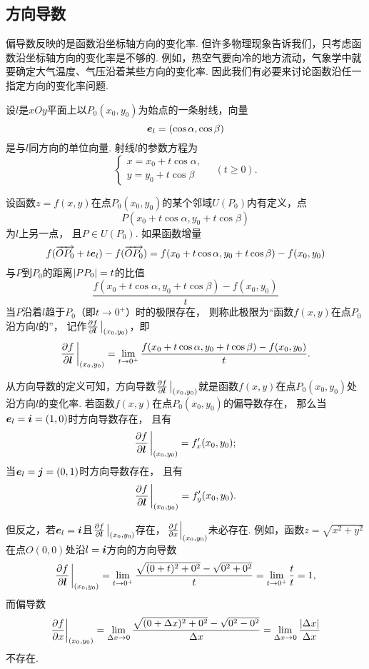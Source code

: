 \subsection{方向导数}
偏导数反映的是函数沿坐标轴方向的变化率.
但许多物理现象告诉我们，只考虑函数沿坐标轴方向的变化率是不够的.
例如，热空气要向冷的地方流动，气象学中就要确定大气温度、气压沿着某些方向的变化率.
因此我们有必要来讨论函数沿任一指定方向的变化率问题.

\begin{definition}
设\(l\)是\(xOy\)平面上以\(P_0(x_0,y_0)\)为始点的一条射线，向量\[
	\boldsymbol{e}_l=(\cos\alpha,\cos\beta)
\]是与\(l\)同方向的单位向量.
射线\(l\)的参数方程为\[
	\left\{ \begin{array}{l}
		x=x_0+t\cos\alpha, \\
		y=y_0+t\cos\beta
	\end{array} \right.
	\quad(t \geq 0).
\]

设函数\(z=f(x,y)\)在点\(P_0(x_0,y_0)\)的某个邻域\(U(P_0)\)内有定义，点\[
	P(x_0+t\cos\alpha,y_0+t\cos\beta)
\]为\(l\)上另一点，
且\(P \in U(P_0)\).
如果函数增量\[
	f(\overrightarrow{O P_0} + t \boldsymbol{e}_l) - f(\overrightarrow{O P_0})
	= f(x_0+t\cos\alpha,y_0+t\cos\beta)-f(x_0,y_0)
\]与\(P\)到\(P_0\)的距离\(\abs{PP_0}=t\)的比值\[
\frac{f(x_0+t\cos\alpha,y_0+t\cos\beta)-f(x_0,y_0)}{t}
\]当\(P\)沿着\(l\)趋于\(P_0\)（即\(t\to0^+\)）时的极限存在，
则称此极限为“函数\(f(x,y)\)在点\(P_0\)沿方向\(l\)的”，
记作\(\pdv{f}{\vb{l}}\eval_{(x_0,y_0)}\)，即\[
\pdv{f}{\vb{l}}\eval_{(x_0,y_0)}
=\lim_{t\to0^+} \frac{f(x_0+t\cos\alpha,y_0+t\cos\beta)-f(x_0,y_0)}{t}.
\]
\end{definition}

从方向导数的定义可知，方向导数\(\pdv{f}{\vb{l}}\eval_{(x_0,y_0)}\)就是函数\(f(x,y)\)在点\(P_0(x_0,y_0)\)处沿方向\(l\)的变化率.
若函数\(f(x,y)\)在点\(P_0(x_0,y_0)\)的偏导数存在，
那么当\(\boldsymbol{e}_l = \boldsymbol{i} = (1,0)\)时方向导数存在，
且有\[
	\pdv{f}{\vb{l}}\eval_{(x_0,y_0)} = f'_x(x_0,y_0);
\]
当\(\boldsymbol{e}_l = \boldsymbol{j} = (0,1)\)时方向导数存在，
且有\[
	\pdv{f}{\vb{l}}\eval_{(x_0,y_0)} = f'_y(x_0,y_0).
\]

但反之，若\(\boldsymbol{e}_l = \boldsymbol{i}\)且\(\pdv{f}{\vb{l}}\eval_{(x_0,y_0)}\)存在，\(\eval{\pdv{f}{x}}_{(x_0,y_0)}\)未必存在.
例如，函数\(z = \sqrt{x^2+y^2}\)在点\(O(0,0)\)处沿\(l = \boldsymbol{i}\)方向的方向导数\[
\pdv{f}{\vb{l}}\eval_{(x_0,y_0)}
= \lim_{t\to0^+} \frac{\sqrt{(0+t)^2+0^2}-\sqrt{0^2+0^2}}{t}
= \lim_{t\to0^+} \frac{t}{t} = 1,
\]而偏导数\[
\eval{\pdv{f}{x}}_{(x_0,y_0)}
= \lim_{\increment x\to0} \frac{\sqrt{(0+\increment x)^2+0^2}-\sqrt{0^2-0^2}}{\increment x}
= \lim_{\increment x\to0} \frac{\abs{\increment x}}{\increment x}
\]不存在.

